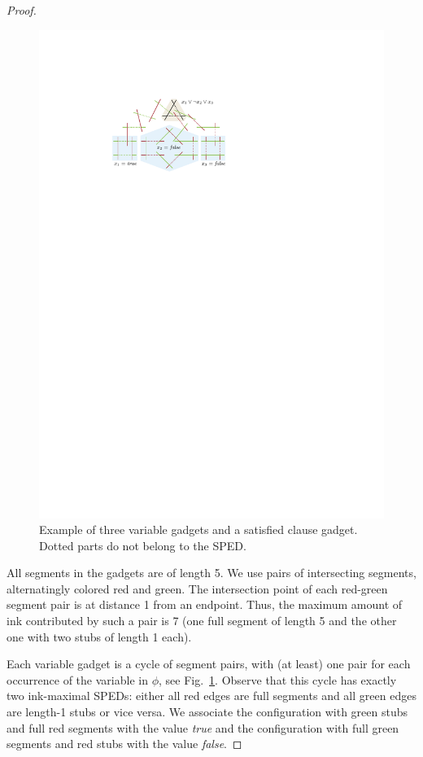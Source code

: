 \documentclass[a4paper,english,numberwithinsect]{eurocg18}
\begin{document}
\begin{proof}
\begin{figure}
			\centering
\includegraphics{Reduction_visual}
\caption{Example of three variable gadgets and a satisfied clause gadget. Dotted parts do not belong to the SPED.}
\label{fig:gadget_connection}
		\end{figure}
	All segments in the gadgets are of length 5.
	We use pairs of intersecting segments, alternatingly colored red and green.
	The intersection point of each red-green segment pair is at distance 1 from an endpoint.
	Thus, the maximum amount of ink contributed by such a pair is 7 (one full segment of length 5 and the other one with two stubs of length 1 each).
	
	Each variable gadget is a cycle of segment pairs, with (at least) one pair for each occurrence of the variable in $\phi$, see Fig.~\ref{fig:gadget_connection}. 
	Observe that this cycle has exactly two ink-maximal SPEDs: either all red edges are full segments and all green edges are length-1 stubs or vice versa.
	We associate the configuration with green stubs and full red segments with the value \emph{true} and the configuration with full green segments and red stubs with the value \emph{false}.
	

\end{proof}
\end{document}
